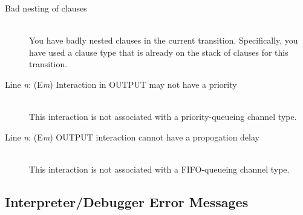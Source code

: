\begin{description}
\item[Bad nesting of clauses]\mbox{}\\
You have badly nested clauses in the current transition. Specifically,
you have used a clause type that is already on the stack of clauses
for this transition.

\item[Line {\em n}: (E{\em m}) Interaction in OUTPUT may not have a priority]\mbox{}\\

This interaction is not associated with a priority-queueing channel
type.

\item[Line {\em n}: (E{\em m}) OUTPUT interaction cannot have a propogation delay]\mbox{}\\

This interaction is not associated with a FIFO-queueing channel type.

\end{description}


\subsection[Interpreter/Debugger Error Messages]{Interpreter/Debugger
Error Messages}

